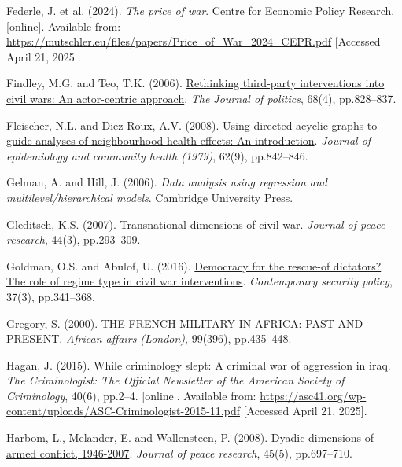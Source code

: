 \documentclass[
]{article}
\newlength{\cslhangindent}
\newenvironment{CSLReferences}[2] %
 {\begin{list}{}{%
  \setlength{\itemindent}{0pt}
  \setlength{\leftmargin}{0pt}
  \setlength{\parsep}{0pt}
  \ifodd #1
   \setlength{\leftmargin}{\cslhangindent}
   \setlength{\itemindent}{-1\cslhangindent}
  \fi
  \setlength{\itemsep}{#2\baselineskip}}}
 {\end{list}}
\begin{document}
\begin{CSLReferences}{0}{1}
Federle, J. et al. (2024). \emph{The price of war}. Centre for Economic
Policy Research. {[}online{]}. Available from:
\url{https://mutschler.eu/files/papers/Price_of_War_2024_CEPR.pdf}
{[}Accessed April 21, 2025{]}.

Findley, M.G. and Teo, T.K. (2006).
\href{https://doi.org/10.1111/j.1468-2508.2006.00473.x}{Rethinking
third-party interventions into civil wars: An actor-centric approach}.
\emph{The Journal of politics}, 68(4), pp.828--837.

Fleischer, N.L. and Diez Roux, A.V. (2008).
\href{https://doi.org/10.1136/jech.2007.067371}{Using directed acyclic
graphs to guide analyses of neighbourhood health effects: An
introduction}. \emph{Journal of epidemiology and community health
(1979)}, 62(9), pp.842--846.

Gelman, A. and Hill, J. (2006). \emph{Data analysis using regression and
multilevel/hierarchical models}. Cambridge University Press.

Gleditsch, K.S. (2007).
\href{https://doi.org/10.1177/0022343307076637}{Transnational dimensions
of civil war}. \emph{Journal of peace research}, 44(3), pp.293--309.

Goldman, O.S. and Abulof, U. (2016).
\href{https://doi.org/10.1080/13523260.2016.1228033}{Democracy for the
rescue-of dictators? The role of regime type in civil war
interventions}. \emph{Contemporary security policy}, 37(3), pp.341--368.

Gregory, S. (2000). \href{https://doi.org/10.1093/afraf/99.396.435}{THE
FRENCH MILITARY IN AFRICA: PAST AND PRESENT}. \emph{African affairs
(London)}, 99(396), pp.435--448.

Hagan, J. (2015). While criminology slept: A criminal war of aggression
in iraq. \emph{The Criminologist: The Official Newsletter of the
American Society of Criminology}, 40(6), pp.2--4. {[}online{]}.
Available from:
\url{https://asc41.org/wp-content/uploads/ASC-Criminologist-2015-11.pdf}
{[}Accessed April 21, 2025{]}.

Harbom, L., Melander, E. and Wallensteen, P. (2008).
\href{https://doi.org/10.1177/0022343308094331}{Dyadic dimensions of
armed conflict, 1946-2007}. \emph{Journal of peace research}, 45(5),
pp.697--710.


\end{CSLReferences}
\end{document}
